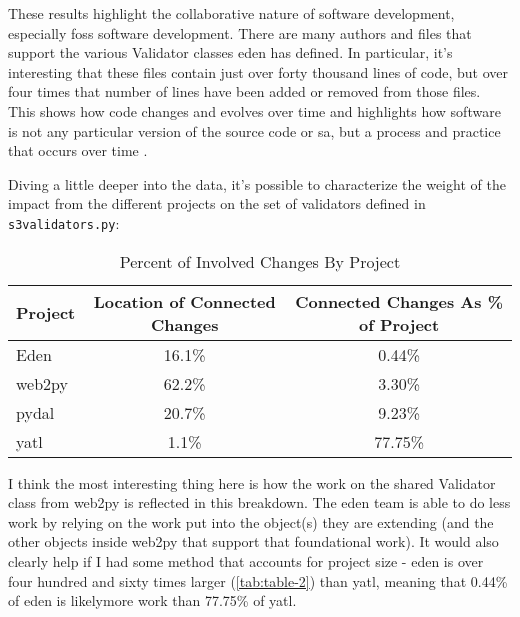 \documentclass[a4paper,man,natbib,floatsintext]{apa6}
\begin{document}
  These results highlight the collaborative nature of software development, especially \acrshort{foss} software development. There are many authors and files that support the various Validator classes \acrshort{eden} has defined. In particular, it's interesting that these files contain just over forty thousand lines of code, but over four times that number of lines have been added or removed from those files. This shows how code changes and evolves over time and highlights how software is not any particular version of the source code or \gls{sa}, but a process and practice that occurs over time \citep{Mackenzie2006-hb}.  

  Diving a little deeper into the data, it's possible to characterize the weight of the impact from the different projects on the set of validators defined in \verb|s3validators.py|:

  \begin{table}[ht]
  \caption{Percent of Involved Changes By Project}
  \label{tab:change-locations}
  \begin{tabular}{|l|c|c|}
\hline
\textbf{Project} & \textbf{Location of Connected Changes} & \textbf{Connected Changes As \% of Project} \\ \hline
Eden                  & 16.1\%                                       & 0.44\%                           \\ \hline
web2py                & 62.2\%                                       & 3.30\%                           \\ \hline
pydal                 & 20.7\%                                       & 9.23\%                           \\ \hline
yatl                  & 1.1\%                                        & 77.75\%                          \\ \hline
\end{tabular}
\end{table}

  I think the most interesting thing here is how the work on the shared Validator class from web2py is reflected in this breakdown. The \acrshort{eden} team is able to do less work by relying on the work put into the object(s) they are extending (and the other objects inside web2py that support that foundational work). It would also clearly help if I had some method that accounts for project size - \acrshort{eden} is over four hundred and sixty times larger (\ref{tab:table-2}) than yatl, meaning that 0.44\% of \acrshort{eden} is likely\footnotemark more work than 77.75\% of yatl.
\end{document}

